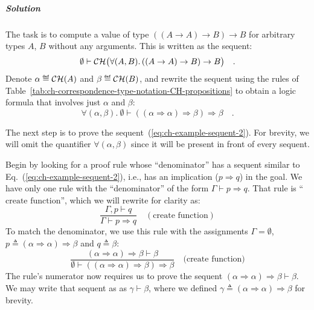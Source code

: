 \subparagraph{Solution}

The task is to compute a value of type $((A\rightarrow A)\rightarrow B)\rightarrow B$
for arbitrary types $A$, $B$ without any arguments. This is written
as the sequent: 
\[
\emptyset\vdash{\cal CH}\big(\forall(A,B).\,((A\rightarrow A)\rightarrow B)\rightarrow B\big)\quad.
\]
Denote $\alpha\triangleq{\cal CH}(A)$ and $\beta\triangleq{\cal CH}(B)$,
and rewrite the sequent using the rules of Table~\ref{tab:ch-correspondence-type-notation-CH-propositions}
to obtain a logic formula that involves just $\alpha$ and $\beta$:
\begin{equation}
\forall(\alpha,\beta).~\emptyset\vdash((\alpha\Rightarrow\alpha)\Rightarrow\beta)\Rightarrow\beta\quad.\label{eq:ch-example-sequent-2}
\end{equation}

The next step is to prove the sequent~(\ref{eq:ch-example-sequent-2}).
For brevity, we will omit the quantifier $\forall(\alpha,\beta)$
since it will be present in front of every sequent.

Begin by looking for a proof rule whose \textsf{``}denominator\textsf{''} has a sequent
similar to Eq.~(\ref{eq:ch-example-sequent-2}), i.e., has an implication
($p\Rightarrow q$) in the goal. We have only one rule with the \textsf{``}denominator\textsf{''}
of the form $\Gamma\vdash p\Rightarrow q$. That rule is \textsf{``}$\text{create function}$\textsf{''},
which we will rewrite for clarity as:
\[
\frac{\Gamma,p\vdash q}{\Gamma\vdash p\Rightarrow q}\quad(\text{create function})
\]
To match the denominator, we use this rule with the assignments $\Gamma=\emptyset$,
$p\triangleq(\alpha\Rightarrow\alpha)\Rightarrow\beta$ and $q\triangleq\beta$:
\[
\frac{(\alpha\Rightarrow\alpha)\Rightarrow\beta\vdash\beta}{\emptyset\vdash((\alpha\Rightarrow\alpha)\Rightarrow\beta)\Rightarrow\beta}\quad\text{(create function)}
\]
The rule\textsf{'}s numerator now requires us to prove the sequent $(\alpha\Rightarrow\alpha)\Rightarrow\beta\vdash\beta$.
We may write that sequent as as $\gamma\vdash\beta$, where we defined
$\gamma\triangleq(\alpha\Rightarrow\alpha)\Rightarrow\beta$ for brevity.

